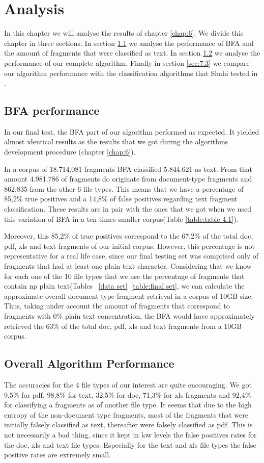 \chapter{Analysis}
In this chapter we will analyse the results of chapter \ref{chap:6}. We divide this chapter in three sections. In section \ref{sec:7.1} we analyse the performance of BFA and the amount of fragments that were classified as text. In section  \ref{sec:7.2} we analyse the performance of our complete algorithm. Finally in section  \ref{sec:7.3} we compare our algorithm performance with the classification algorithms that Shahi tested in \cite{Shahi}.

\section{BFA performance}\label{sec:7.1}
In our final test, the BFA part of our algorithm performed as expected. It yielded almost identical results as the results that we got during the algorithms development procedure (chapter \ref{chap:6}).

In a corpus of 18.714.081 fragments BFA classified 5.844.621 as text. From that amount 4.981.786 of fragments do originate from document-type fragments and 862.835 from the other 6 file types. This means that we have a percentage of 85,2\% true positives and a 14,8\% of false positives regarding text fragment classification. These results are in pair with the ones that we got when we used this variation of BFA in a ten-times smaller corpus(Table \ref{table:table 4.1}).

Moreover, this 85,2\% of true positives correspond to the 67,2\% of the total doc, pdf, xls and text fragments of our initial corpus. However, this percentage is not representative for a real life case, since our final testing set was comprised only of fragments that had at least one plain text character. Considering that we know for each one of the 10 file types that we use the percentage of fragments that contain np plain text(Tables ~\ref{data set}~\ref{table:final set}, we can calculate the approximate overall document-type fragment retrieval in a corpus of 10GB size. Thus, taking under account the amount of fragments that correspond to fragments with 0\% plain text concentration, the BFA would have approximately retrieved the 63\% of the total doc, pdf, xls and text fragments from a 10GB corpus.

\section{Overall Algorithm Performance}\label{sec:7.2}
The accuracies for the 4 file types of our interest are quite encouraging. We got 9,5\% for pdf, 98,8\% for text, 32,5\% for doc, 71,3\% for xls fragments and 92,4\% for classifying a fragments as of another file type. It seems that due to the high entropy of the non-document type fragments, most of the fragments that were initially falsely classified as text, thereafter were falsely classified as pdf. This is not necessarily a bad thing, since it kept in low levels the false positives rates for the doc, xls and text file types. Especially for the text and xls file types the false positive rates are extremely small.

